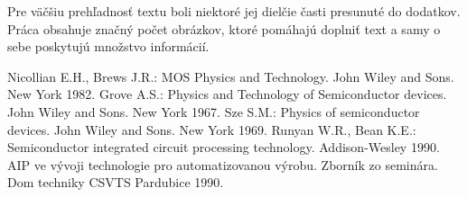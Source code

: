 \par Pre väčšiu prehľadnosť textu boli niektoré jej dielčie časti
presunuté do dodatkov.  Práca obsahuje značný počet obrázkov, ktoré
pomáhajú doplniť text a samy o sebe poskytujú množstvo informácií.


\begin{thebibliography}{}
Nicollian E.H., Brews J.R.: MOS Physics  and  Technology. John Wiley and Sons. New York 1982.
Grove A.S.: Physics and Technology of Semiconductor devices. John Wiley and Sons. New York 1967.
Sze S.M.: Physics of semiconductor devices. John Wiley and Sons. New York 1969.
Runyan W.R., Bean K.E.: Semiconductor integrated circuit  processing technology. Addison-Wesley 1990.
AIP ve vývoji technologie pro automatizovanou výrobu. Zborník zo seminára. Dom techniky CSVTS Pardubice 1990.
\end{thebibliography}
